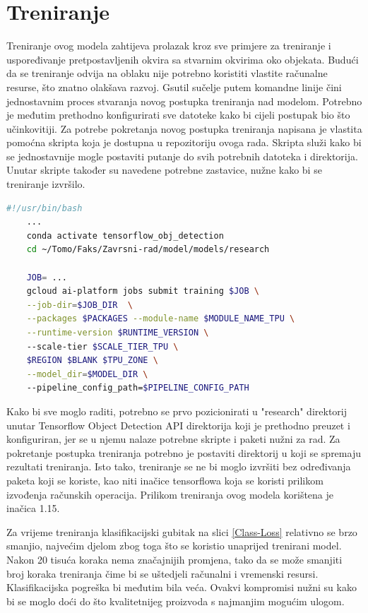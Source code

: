 \section{Treniranje}
Treniranje ovog modela zahtijeva prolazak kroz sve primjere za treniranje i uspoređivanje pretpostavljenih okvira sa stvarnim okvirima oko objekata. Budući da se treniranje odvija na oblaku 
nije potrebno koristiti vlastite računalne resurse, što znatno olakšava razvoj. Gsutil sučelje putem komandne linije čini jednostavnim proces stvaranja novog postupka treniranja nad modelom.
Potrebno je međutim prethodno konfigurirati sve datoteke kako bi cijeli postupak bio što učinkovitiji. Za potrebe pokretanja novog postupka treniranja napisana je vlastita
pomoćna skripta koja je dostupna u repozitoriju ovoga rada. Skripta služi kako bi se jednostavnije mogle postaviti putanje do svih potrebnih datoteka i direktorija. Unutar
skripte također su navedene potrebne zastavice, nužne kako bi se treniranje izvršilo. 

\begin{lstlisting}[language=bash, tabsize=2]
    #!/usr/bin/bash
    ...
    conda activate tensorflow_obj_detection
    cd ~/Tomo/Faks/Zavrsni-rad/model/models/research
    
    JOB= ...
    gcloud ai-platform jobs submit training $JOB \
    --job-dir=$JOB_DIR  \
    --packages $PACKAGES --module-name $MODULE_NAME_TPU \
    --runtime-version $RUNTIME_VERSION \ 
    --scale-tier $SCALE_TIER_TPU \
    $REGION $BLANK $TPU_ZONE \
    --model_dir=$MODEL_DIR \ 
    --pipeline_config_path=$PIPELINE_CONFIG_PATH
\end{lstlisting}
Kako bi sve moglo raditi, potrebno se prvo pozicionirati u "research" direktorij unutar Tensorflow Object Detection API direktorija koji je prethodno preuzet i konfiguriran, jer se u njemu nalaze potrebne skripte i paketi nužni za 
rad. Za pokretanje postupka treniranja potrebno je postaviti direktorij u koji se spremaju rezultati treniranja. \newline Isto tako, treniranje se ne bi moglo izvršiti 
bez određivanja paketa koji se koriste, kao niti inačice tensorflowa koja se koristi prilikom izvođenja računskih operacija. Prilikom treniranja ovog modela korištena je inačica 1.15.

Za vrijeme treniranja klasifikacijski gubitak na slici \ref{Class-Loss} relativno se brzo smanjio, najvećim djelom zbog toga što se koristio unaprijed trenirani model. Nakon 20 tisuća koraka
nema značajnijih promjena, tako da se može smanjiti broj koraka treniranja čime bi se uštedjeli računalni i vremenski resursi. Klasifikacijska pogreška bi međutim bila veća. Ovakvi kompromisi nužni su kako bi se moglo doći do što kvalitetnijeg proizvoda s najmanjim mogućim ulogom.

